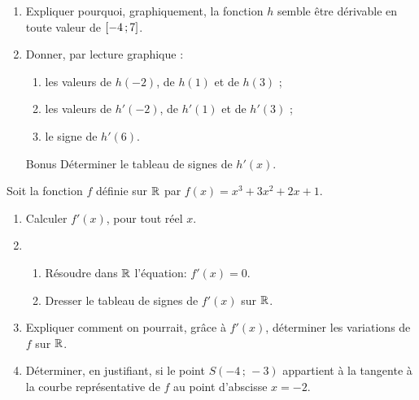 \documentclass[a4paper,11pt]{article}
\begin{document}
\begin{enumerate}
	\item Expliquer pourquoi, graphiquement, la fonction $h$ semble être dérivable en toute valeur de $\mbox{\ensuremath{\left[-4\mathpunct{};7\right]}}$.
	\item Donner, par lecture graphique :
	\begin{enumerate}
		\item les valeurs de $h(-2)$, de $h(1)$ et de $h(3)$ ;
		\item les valeurs de $h'(-2)$, de $h'(1)$ et de $h'(3)$ ;
		\item le signe de $h'(6)$.
	\end{enumerate}
	\item[Bonus] Déterminer le tableau de signes de $h'(x)$.
\end{enumerate}

\medskip


\medskip

Soit la fonction $f$ définie sur $\R$ par $f(x) = x^3 +3x^2 +2x +1$.

\begin{enumerate}
	\item Calculer $f'(x)$, pour tout réel $x$.
	\item 
	\begin{enumerate}
		\item Résoudre dans $\R$ l'équation: $f'(x) = 0$.
		\item Dresser le tableau de signes de $f'(x)$ sur $\R$.
	\end{enumerate}
	\item Expliquer comment on pourrait, grâce à $f'(x)$, déterminer les variations de $f$ sur $\R$.
	\item Déterminer, en justifiant, si le point $S(-4\,;\,-3)$ appartient à la tangente à la courbe représentative de $f$ au point d'abscisse $x = -2$.
\end{enumerate}
\end{document}
